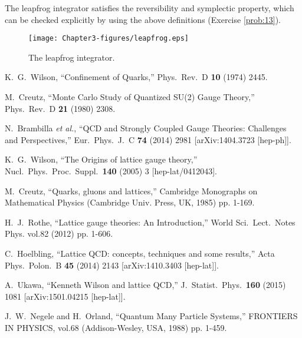 The leapfrog integrator satisfies the reversibility and symplectic property, which can be checked explicitly
by using the above definitions (Exercise \ref{prob:13}).
 
 \begin{figure}[t]
\begin{center}
\texttt{[image: Chapter3-figures/leapfrog.eps]} 
 \end{center}
\caption{The leapfrog integrator.}
\label{fig:LF}
\end{figure}


\begin{thebibliography}{99.}%

  K.~G.~Wilson,
 ``Confinement of Quarks,''
  Phys.\ Rev.\ D {\bf 10} (1974) 2445.
  
  M.~Creutz,
  ``Monte Carlo Study of Quantized SU(2) Gauge Theory,''
  Phys.\ Rev.\ D {\bf 21} (1980) 2308. 
  
  N.~Brambilla {\it et al.},
  ``QCD and Strongly Coupled Gauge Theories: Challenges and Perspectives,''
  Eur.\ Phys.\ J.\ C {\bf 74} (2014) 2981
  [arXiv:1404.3723 [hep-ph]].
   
  K.~G.~Wilson,
  ``The Origins of lattice gauge theory,''
  Nucl.\ Phys.\ Proc.\ Suppl.\  {\bf 140} (2005) 3
  [hep-lat/0412043].
  
  M.~Creutz,
  ``Quarks, gluons and lattices,''
  Cambridge Monographs on Mathematical Physics (Cambridge Univ. Press, UK, 1985) pp. 1-169.
    
  H.~J.~Rothe,
  ``Lattice gauge theories: An Introduction,''
 World Sci.\ Lect.\ Notes Phys. vol.82 (2012) pp. 1-606.

  C.~Hoelbling,
  ``Lattice QCD: concepts, techniques and some results,''
  Acta Phys.\ Polon.\ B {\bf 45} (2014)  2143
  [arXiv:1410.3403 [hep-lat]]. 

  A.~Ukawa,
  ``Kenneth Wilson and lattice QCD,''
  J.\ Statist.\ Phys.\  {\bf 160} (2015) 1081
  [arXiv:1501.04215 [hep-lat]]. 
 
  J.~W.~Negele and H.~Orland,
  ``Quantum Many Particle Systems,''
  FRONTIERS IN PHYSICS, vol.68 (Addison-Wesley, USA, 1988) pp. 1-459.    


\end{thebibliography}
